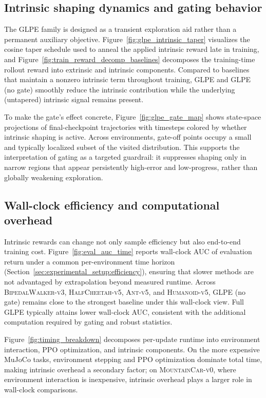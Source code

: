\subsection{Intrinsic shaping dynamics and gating behavior}

The GLPE family is designed as a transient exploration aid rather than a permanent auxiliary objective.
Figure~\ref{fig:glpe_intrinsic_taper} visualizes the cosine taper schedule used to anneal the applied intrinsic reward late in training, and Figure~\ref{fig:train_reward_decomp_baselines} decomposes the training-time rollout reward into extrinsic and intrinsic components.
Compared to baselines that maintain a nonzero intrinsic term throughout training, GLPE and GLPE (no gate) smoothly reduce the intrinsic contribution while the underlying (untapered) intrinsic signal remains present.

To make the gate's effect concrete, Figure~\ref{fig:glpe_gate_map} shows state-space projections of final-checkpoint trajectories with timesteps colored by whether intrinsic shaping is active.
Across environments, gate-off points occupy a small and typically localized subset of the visited distribution.
This supports the interpretation of gating as a targeted guardrail: it suppresses shaping only in narrow regions that appear persistently high-error and low-progress, rather than globally weakening exploration.

\subsection{Wall-clock efficiency and computational overhead}

Intrinsic rewards can change not only sample efficiency but also end-to-end training cost.
Figure~\ref{fig:eval_auc_time} reports wall-clock AUC of evaluation return under a common per-environment time horizon (Section~\ref{sec:experimental_setup:efficiency}), ensuring that slower methods are not advantaged by extrapolation beyond measured runtime.
Across \textsc{BipedalWalker-v3}, \textsc{HalfCheetah-v5}, \textsc{Ant-v5}, and \textsc{Humanoid-v5}, GLPE (no gate) remains close to the strongest baseline under this wall-clock view.
Full GLPE typically attains lower wall-clock AUC, consistent with the additional computation required by gating and robust statistics.

Figure~\ref{fig:timing_breakdown} decomposes per-update runtime into environment interaction, PPO optimization, and intrinsic components.
On the more expensive MuJoCo tasks, environment stepping and PPO optimization dominate total time, making intrinsic overhead a secondary factor; on \textsc{MountainCar-v0}, where environment interaction is inexpensive, intrinsic overhead plays a larger role in wall-clock comparisons.

